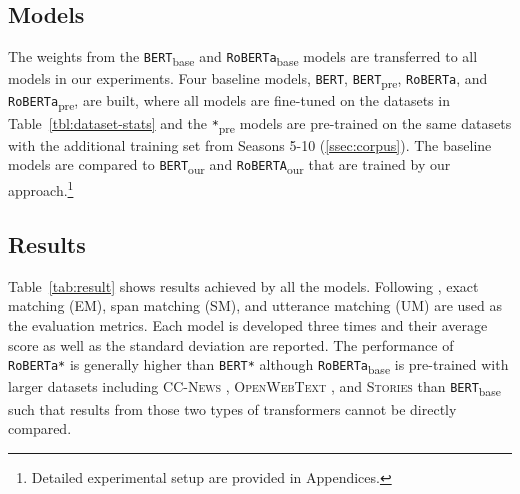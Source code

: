 \documentclass[11pt,a4paper]{article}
\newcommand{\textsec}[1]{\textsection\ref{#1}}
\begin{document}
\subsection{Models}
\label{ssec:models}

The weights from the \texttt{BERT}\textsubscript{base} and \texttt{RoBERTa}\textsubscript{base} models \cite{devlin_2019,liu_2019} are transferred to all models in our experiments.
Four baseline models, \texttt{BERT}, \texttt{BERT}\textsubscript{pre}, \texttt{RoBERTa}, and \texttt{RoBERTa}\textsubscript{pre}, are built, where all models are fine-tuned on the datasets in Table~\ref{tbl:dataset-stats} and the \texttt{*}\textsubscript{pre} models are pre-trained on the same datasets with the additional training set from Seasons 5-10 (\textsec{ssec:corpus}).
The baseline models are compared to \texttt{BERT}\textsubscript{our} and \texttt{RoBERTA}\textsubscript{our} that are trained by our approach.\footnote{Detailed experimental setup are provided in Appendices.}


\subsection{Results}

Table~\ref{tab:result} shows results achieved by all the models.
Following \citet{yang_2019}, exact matching (EM), span matching (SM), and utterance matching (UM) are used as the evaluation metrics.
Each model is developed three times and their average score as well as the standard deviation are reported. 
The performance of \texttt{RoBERTa*} is generally higher than \texttt{BERT*} although \texttt{RoBERTa}\textsubscript{base} is pre-trained with larger datasets including \textsc{CC-News} \cite{nagel_2016}, \textsc{OpenWebText} \cite{gokaslan_2019}, and \textsc{Stories} \cite{trinh_2018} than \texttt{BERT}\textsubscript{base} such that results from those two types of transformers cannot be directly compared.
\end{document}
